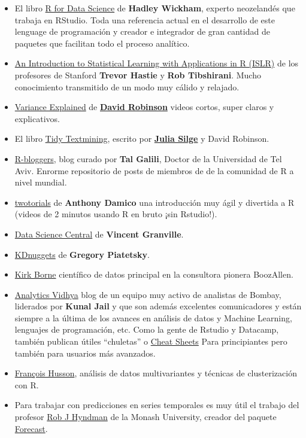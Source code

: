 \documentclass[]{book}
\theoremstyle{definition}
\theoremstyle{definition}
\theoremstyle{definition}
\theoremstyle{remark}
\begin{document}
\begin{itemize}
\item
  El libro \href{https://r4ds.had.co.nz/}{R for Data Science} de
  \textbf{Hadley Wickham}, experto neozelandés que trabaja en RStudio.
  Toda una referencia actual en el desarrollo de este lenguage de
  programación y creador e integrador de gran cantidad de paquetes que
  facilitan todo el proceso analítico.
\item
  \href{https://www-bcf.usc.edu/\%7Egareth/ISL/}{An Introduction to
  Statistical Learning with Applications in R (ISLR)} de los profesores
  de Stanford \textbf{Trevor Hastie} y \textbf{Rob Tibshirani}. Mucho
  conocimiento transmitido de un modo muy cálido y relajado.
\item
  \href{http://varianceexplained.org/RData/}{Variance Explained} de
  \href{https://twitter.com/drob}{\textbf{David Robinson}} videos
  cortos, super claros y explicativos.
\item
  El libro \href{http://tidytextmining.com/intro.html}{Tidy Textmining},
  escrito por \href{https://juliasilge.com/}{\textbf{Julia Silge}} y
  David Robinson.
\item
  \href{https://www.r-bloggers.com}{R-bloggers}, blog curado por
  \textbf{Tal Galili}, Doctor de la Universidad de Tel Aviv. Enrorme
  repositorio de posts de miembros de de la comunidad de R a nivel
  mundial.
\item
  \href{https://www.twotorials.com/}{twotorials} de \textbf{Anthony
  Damico} una introducción muy ágil y divertida a R (videos de 2 minutos
  usando R en bruto ¡sin Rstudio!).
\item
  \href{http://www.datasciencecentral.com}{Data Science Central} de
  \textbf{Vincent Granville}.
\item
  \href{http://www.kdnuggets.com/}{KDnuggets} de \textbf{Gregory
  Piatetsky}.
\item
  \href{http://kirkborne.net/}{Kirk Borne} científico de datos principal
  en la consultora pionera BoozAllen.
\item
  \href{https://www.analyticsvidhya.com}{Analytics Vidhya} blog de un
  equipo muy activo de analistas de Bombay, liderados por \textbf{Kunal
  Jail} y que son además excelentes comunicadores y están siempre a la
  última de los avances en análisis de datos y Machine Learning,
  lenguajes de programación, etc. Como la gente de Rstudio y Datacamp,
  también publican útiles ``chuletas'' o
  \href{https://www.analyticsvidhya.com/blog/2017/02/top-28-cheat-sheets-for-machine-learning-data-science-probability-sql-big-data/}{Cheat
  Sheets} Para principiantes pero también para usuarios más avanzados.
\item
  \href{http://math.agrocampus-ouest.fr/infoglueDeliverLive/membres/Francois.Husson}{François
  Husson}, análisis de datos multivariantes y técnicas de clusterización
  con R.
\item
  Para trabajar con predicciones en series temporales es muy útil el
  trabajo del profesor \href{https://www.otexts.org/fpp}{Rob J Hyndman}
  de la Monash University, creador del paquete
  \href{http://robjhyndman.com/software/forecast/\%22}{Forecast}.
\end{itemize}
\end{document}

